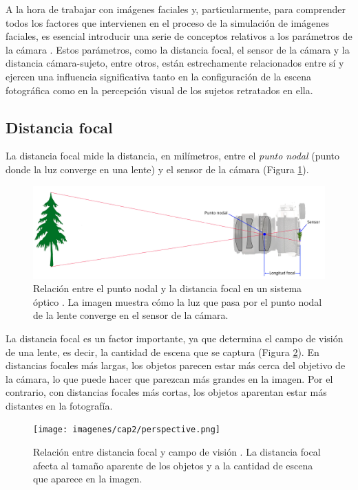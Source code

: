 A la hora de trabajar con imágenes faciales y, particularmente, para comprender todos los factores que intervienen en el proceso de la simulación de imágenes faciales, es esencial introducir una serie de conceptos relativos a los parámetros de la cámara \cite{51,67,68,69}. Estos parámetros, como la distancia focal, el sensor de la cámara y la distancia cámara-sujeto, entre otros, están estrechamente relacionados entre sí y ejercen una influencia significativa tanto en la configuración de la escena fotográfica como en la percepción visual de los sujetos retratados en ella.

\subsection*{Distancia focal}
La distancia focal mide la distancia, en milímetros, entre el \textit{punto nodal} (punto donde la luz converge en una lente) y el sensor de la cámara (Figura \ref{fig11}). 

\begin{figure}[h]
	\centering
	\includegraphics[scale=0.2]{imagenes/cap2/focal.png}
	\caption[Relación entre punto nodal y distancia focal.]{Relación entre el punto nodal y la distancia focal en un sistema óptico \cite{44}. La imagen muestra cómo la luz que pasa por el punto nodal de la lente converge en el sensor de la cámara.}
	\label{fig11}
\end{figure}

La distancia focal es un factor importante, ya que determina el campo de visión de una lente, es decir, la cantidad de escena que se captura (Figura \ref{fig11.2}).  En distancias focales más largas, los objetos parecen estar más cerca del objetivo de la cámara, lo que puede hacer que parezcan más grandes en la imagen. Por el contrario, con distancias focales más cortas, los objetos aparentan estar más distantes en la fotografía.

\begin{figure}[h]
	\centering
	\texttt{[image: imagenes/cap2/perspective.png]}
	\caption[Relación entre distancia focal y campo de visión.]{Relación entre distancia focal y campo de visión \cite{96}. La distancia focal afecta al tamaño aparente de los objetos y a la cantidad de escena que aparece en la imagen.}
	\label{fig11.2}
\end{figure}

